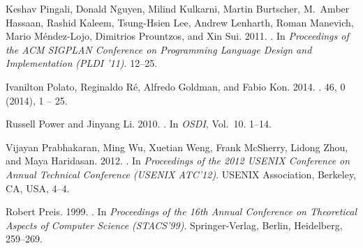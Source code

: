 \documentclass[reprint,twocolumn,showpacs,preprintnumbers,amsmath, aps,pre,amssymb]{revtex4-1}
\begin{document}
\begin{thebibliography}{00}
{
{Keshav Pingali}, {Donald Nguyen}, {Milind Kulkarni}, {Martin Burtscher},
  {M.~Amber Hassaan}, {Rashid Kaleem}, {Tsung-Hsien Lee}, {Andrew Lenharth},
  {Roman Manevich}, {Mario M\'{e}ndez-Lojo}, {Dimitrios Prountzos}, {and} {Xin
  Sui}. 2011.
\newblock {}. In {\em
  Proceedings of the ACM SIGPLAN Conference on Programming Language Design and
  Implementation} {\em (PLDI '11)}. 12--25.
\newblock
{}


{Ivanilton Polato}, {Reginaldo Ré}, {Alfredo Goldman}, {and} {Fabio Kon}.
  2014.
\newblock {}.
 {46}, 0 (2014),
  1 -- 25.
\newblock
{}


{Russell Power} {and} {Jinyang Li}. 2010.
\newblock {}. In {\em OSDI}, Vol.~10. 1--14.
\newblock


{Vijayan Prabhakaran}, {Ming Wu}, {Xuetian Weng}, {Frank McSherry}, {Lidong
  Zhou}, {and} {Maya Haridasan}. 2012.
\newblock {}. In {\em Proceedings of the 2012 USENIX Conference on Annual
  Technical Conference} {\em (USENIX ATC'12)}. USENIX Association, Berkeley,
  CA, USA, 4--4.
\newblock
{}


{Robert Preis}. 1999.
\newblock {}. In {\em Proceedings of the 16th
  Annual Conference on Theoretical Aspects of Computer Science} {\em
  (STACS'99)}. Springer-Verlag, Berlin, Heidelberg, 259--269.
\newblock
{}


}
\end{thebibliography}
\end{document}

